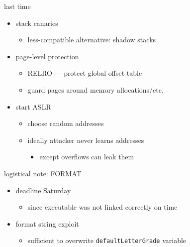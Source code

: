 \begin{frame}
    \titlepage
\end{frame}


\begin{frame}{last time}
    \begin{itemize}
            \item stack canaries
            \begin{itemize}
                \item less-compatible alternative: shadow stacks
            \end{itemize}
            \item page-level protection
                \begin{itemize}
                \item RELRO --- protect global offset table
                \item guard pages around memory allocations/etc.
                \end{itemize}
            \item start ASLR
                \begin{itemize}
                \item choose random addresses
                \item ideally attacker never learns addresses
                    \begin{itemize}
                    \item except overflows can leak them
                    \end{itemize}
                \end{itemize}
    \end{itemize}
\end{frame}

\begin{frame}{logistical note: FORMAT}
    \begin{itemize}
    \item deadline Saturday 
    \begin{itemize}\item since executable was not linked correctly on time\end{itemize}
    \item format string exploit
        \begin{itemize}
        \item sufficient to overwrite \texttt{defaultLetterGrade} variable
        \end{itemize}
    \end{itemize}
\end{frame}

